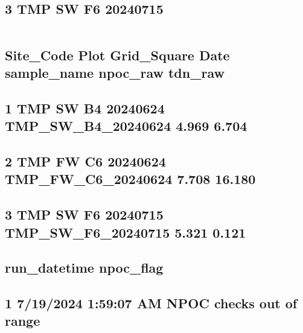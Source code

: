 \documentclass[
]{article}
\begin{document}
\hypertarget{tmp-sw-f6-20240715}{%
\subsection{3 TMP SW F6 20240715}\label{tmp-sw-f6-20240715}}

\begin{verbatim}
\end{verbatim}

\hypertarget{site_code-plot-grid_square-date-sample_name-npoc_raw-tdn_raw}{%
\subsection{Site\_Code Plot Grid\_Square Date sample\_name npoc\_raw
tdn\_raw}\label{site_code-plot-grid_square-date-sample_name-npoc_raw-tdn_raw}}

\hypertarget{tmp-sw-b4-20240624-tmp_sw_b4_20240624-4.969-6.704}{%
\subsection{1 TMP SW B4 20240624 TMP\_SW\_B4\_20240624 4.969
6.704}\label{tmp-sw-b4-20240624-tmp_sw_b4_20240624-4.969-6.704}}

\hypertarget{tmp-fw-c6-20240624-tmp_fw_c6_20240624-7.708-16.180}{%
\subsection{2 TMP FW C6 20240624 TMP\_FW\_C6\_20240624 7.708
16.180}\label{tmp-fw-c6-20240624-tmp_fw_c6_20240624-7.708-16.180}}

\hypertarget{tmp-sw-f6-20240715-tmp_sw_f6_20240715-5.321-0.121}{%
\subsection{3 TMP SW F6 20240715 TMP\_SW\_F6\_20240715 5.321
0.121}\label{tmp-sw-f6-20240715-tmp_sw_f6_20240715-5.321-0.121}}

\hypertarget{run_datetime-npoc_flag}{%
\subsection{run\_datetime npoc\_flag}\label{run_datetime-npoc_flag}}

\hypertarget{am-npoc-checks-out-of-range}{%
\subsection{1 7/19/2024 1:59:07 AM NPOC checks out of
range}\label{am-npoc-checks-out-of-range}}
\end{document}
